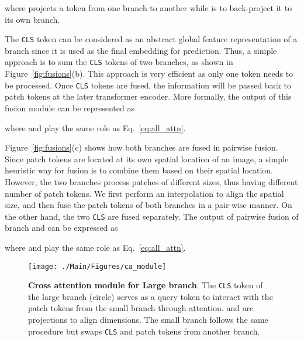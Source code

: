 \documentclass[10pt,twocolumn,letterpaper]{article}
\def\clstoken{\texttt{CLS}\xspace}
\newcommand{\myparagraph}[1]{\vspace{1mm} \noindent {\textbf{#1}}}
\begin{document}
 
where  projects a token from one branch to another while  is to back-project it to its own branch.

\vspace{1mm}
\myparagraph{Class Token Fusion.} 
The \clstoken token can be considered as an abstract global feature representation of a branch since it is used as the final embedding for prediction. Thus, a simple approach is to sum the \clstoken tokens of two branches, as shown in Figure~\ref{fig:fusions}(b). This approach is very efficient as only one token needs to be processed. Once \clstoken tokens are fused, the information will be passed back to patch tokens at the later transformer encoder. More formally, the output  of this fusion module can be represented as 

 
where  and  play the same role as Eq.~\ref{eq:all_attn}.


\vspace{1mm}
\myparagraph{Pairwise Fusion.} 
Figure~\ref{fig:fusions}(c) shows how both branches are fused in pairwise fusion. Since patch tokens are located at its own spatial location of an image, a simple heuristic way for fusion is to combine them based on their spatial location. However, the two branches process patches of different sizes, thus having different number of patch tokens. We first perform an interpolation to align the spatial size, and then fuse the patch tokens of both branches in a pair-wise manner. On the other hand, the two \clstoken are fused separately. The output  of pairwise fusion of branch  and  can be expressed as

 
where  and  play the same role as Eq.~\ref{eq:all_attn}.




\begin{figure}[tb!]
    \centering
    \texttt{[image: ./Main/Figures/ca\_module]}
\caption{\textbf{Cross attention module for Large branch}. The \clstoken token of the large branch (circle) serves as a query token to interact with the patch tokens from the small branch through attention.
 and  are projections to align dimensions. The small branch follows the same procedure but swaps \clstoken and patch tokens from another branch. 
}
    \label{fig:ca_module} 
\end{figure}
\end{document}
